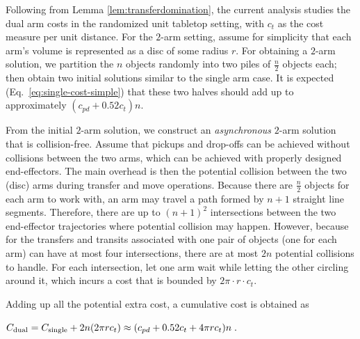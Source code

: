 
Following from Lemma \ref{lem:transferdomination}, the current analysis studies the dual arm costs in the randomized unit tabletop setting, with $c_t$ as the cost measure per unit distance. 
For the $2$-arm setting, assume for simplicity that each arm's volume is represented as a disc of some radius 
$r$. For obtaining a $2$-arm solution, we partition the $n$ objects randomly 
into two piles of $\frac{n}{2}$ objects each; then obtain two initial solutions 
similar to the single arm case. It is expected (Eq.~\ref{eq:single-cost-simple}) that these two halves 
should add up to approximately $(c_{pd} + 0.52c_t)n$. 


From the initial $2$-arm solution, we construct an {\em asynchronous} $2$-arm 
solution that is collision-free. Assume that pickups 
and drop-offs can be achieved without collisions between the two arms, which 
can be achieved with properly designed end-effectors. The main overhead 
is then the potential collision between the two (disc) arms during transfer 
and move operations. Because there are $\frac{n}{2}$ objects for each arm to work 
with, an arm may travel a path formed by $n + 1$ straight line 
segments. Therefore, there are up to $(n + 1)^2$ intersections between the 
two end-effector trajectories where potential collision may happen. However,
because for the transfers and transits associated with one pair of objects (one 
for each arm) can have at most four intersections, there are at most 
$2n$ potential collisions to handle. For each intersection, let one 
arm wait while letting the other circling around it, which incurs a cost that is bounded by $2\pi \cdot
r \cdot c_t$. 


Adding up all the potential extra cost,  
a cumulative cost is obtained as 

{\centerline
{
$C_{\rm dual} = C_{\rm single} + 2n(2\pi rc_t) \approx (c_{pd} + 0.52c_t + 4\pi rc_t)n\;.$
}
}

